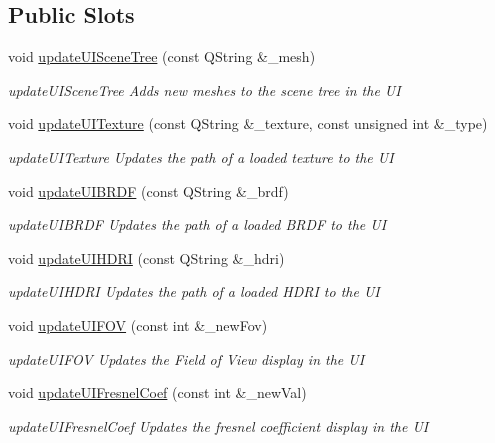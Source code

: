 \subsection*{Public Slots}
\begin{DoxyCompactItemize}
\item 
void \hyperlink{classMainWindow_a8e0e73b8bba2c32a5f1a3c6a0ae5089d}{update\-U\-I\-Scene\-Tree} (const Q\-String \&\-\_\-mesh)
\begin{DoxyCompactList}\small\item\em update\-U\-I\-Scene\-Tree Adds new meshes to the scene tree in the U\-I \end{DoxyCompactList}\item 
void \hyperlink{classMainWindow_acf4fa9e3d00f6b0d368d6cf7868b618a}{update\-U\-I\-Texture} (const Q\-String \&\-\_\-texture, const unsigned int \&\-\_\-type)
\begin{DoxyCompactList}\small\item\em update\-U\-I\-Texture Updates the path of a loaded texture to the U\-I \end{DoxyCompactList}\item 
void \hyperlink{classMainWindow_a94c97346b7f1e4f0d35844e9d193a79c}{update\-U\-I\-B\-R\-D\-F} (const Q\-String \&\-\_\-brdf)
\begin{DoxyCompactList}\small\item\em update\-U\-I\-B\-R\-D\-F Updates the path of a loaded B\-R\-D\-F to the U\-I \end{DoxyCompactList}\item 
void \hyperlink{classMainWindow_ada92e077013a39ba4fffb39385b8f8d3}{update\-U\-I\-H\-D\-R\-I} (const Q\-String \&\-\_\-hdri)
\begin{DoxyCompactList}\small\item\em update\-U\-I\-H\-D\-R\-I Updates the path of a loaded H\-D\-R\-I to the U\-I \end{DoxyCompactList}\item 
void \hyperlink{classMainWindow_a3e635401d6f115c89799ccb4be12f4f2}{update\-U\-I\-F\-O\-V} (const int \&\-\_\-new\-Fov)
\begin{DoxyCompactList}\small\item\em update\-U\-I\-F\-O\-V Updates the Field of View display in the U\-I \end{DoxyCompactList}\item 
void \hyperlink{classMainWindow_aab6c5078d2405b7938278b53fc8b9c14}{update\-U\-I\-Fresnel\-Coef} (const int \&\-\_\-new\-Val)
\begin{DoxyCompactList}\small\item\em update\-U\-I\-Fresnel\-Coef Updates the fresnel coefficient display in the U\-I \end{DoxyCompactList}\item 

\end{DoxyCompactItemize}
